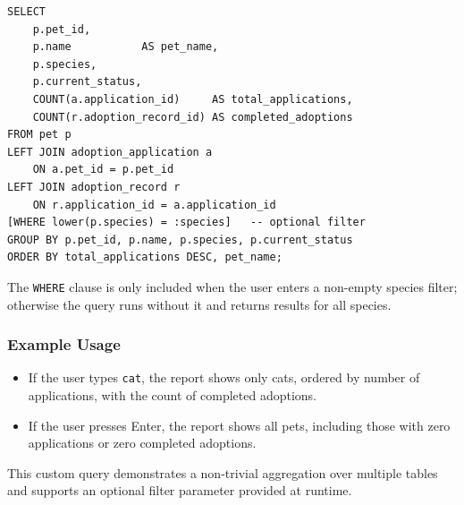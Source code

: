 \documentclass[11pt]{article}
\begin{document}
\begin{verbatim}
SELECT
    p.pet_id,
    p.name           AS pet_name,
    p.species,
    p.current_status,
    COUNT(a.application_id)     AS total_applications,
    COUNT(r.adoption_record_id) AS completed_adoptions
FROM pet p
LEFT JOIN adoption_application a
    ON a.pet_id = p.pet_id
LEFT JOIN adoption_record r
    ON r.application_id = a.application_id
[WHERE lower(p.species) = :species]   -- optional filter
GROUP BY p.pet_id, p.name, p.species, p.current_status
ORDER BY total_applications DESC, pet_name;
\end{verbatim}

The \texttt{WHERE} clause is only included when the user enters a non-empty
species filter; otherwise the query runs without it and returns results for all
species.

\subsubsection{Example Usage}

\begin{itemize}
    \item If the user types \texttt{cat}, the report shows only cats, ordered by
          number of applications, with the count of completed adoptions.
    \item If the user presses Enter, the report shows all pets, including those
          with zero applications or zero completed adoptions.
\end{itemize}

This custom query demonstrates a non-trivial aggregation over multiple tables
and supports an optional filter parameter provided at runtime.
\end{document}

